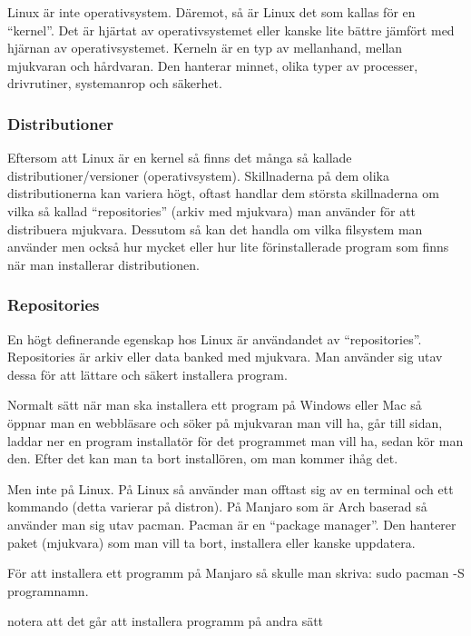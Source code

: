 \documentclass[12pt, a4paper]{report}
\begin{document}
   Linux är inte operativsystem. Däremot, så är Linux det som kallas för en ``kernel''\cite{redhat}. Det är hjärtat av operativsystemet eller kanske lite bättre jämfört med hjärnan av operativsystemet. Kerneln är en typ av mellanhand, mellan mjukvaran och hårdvaran. Den hanterar minnet, olika typer av processer, drivrutiner, systemanrop och säkerhet.
 

    \subsubsection{Distributioner}

   Eftersom att Linux är en kernel så finns det många så kallade distributioner/versioner (operativsystem). Skillnaderna på dem olika distributionerna kan variera högt, oftast handlar dem största skillnaderna om vilka så kallad ``repositories'' (arkiv med mjukvara) man använder för att distribuera mjukvara. Dessutom så kan det handla om vilka filsystem man använder men också hur mycket eller hur lite förinstallerade program som finns när man installerar distributionen.

   \subsubsection{Repositories}

    En högt definerande egenskap hos Linux är användandet av ``repositories''. Repositories är arkiv eller data banked med mjukvara. Man använder sig utav dessa för att lättare och säkert installera program.

    Normalt sätt när man ska installera ett program på Windows eller Mac så öppnar man en webbläsare och söker på mjukvaran man vill ha, går till sidan, laddar ner en program installatör för det programmet man vill ha, sedan kör man den. Efter det kan man ta bort installören, om man kommer ihåg det.
    
    Men inte på Linux. På Linux så använder man offtast sig av en terminal och ett kommando (detta varierar på distron).
    På Manjaro som är Arch baserad så använder man sig utav pacman\cite{pacman}. Pacman är en ``package manager''\cite{pkgmanager}. Den hanterer paket (mjukvara) som man vill ta bort, installera eller kanske uppdatera.

    För att installera ett programm på Manjaro så skulle man skriva: sudo pacman -S programnamn. 

    \small{notera att det går att installera programm på andra sätt}
\end{document}
